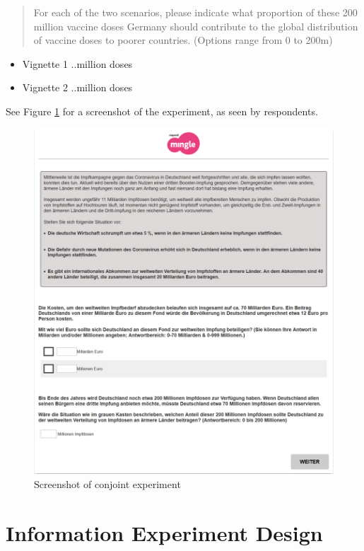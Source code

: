 \documentclass[12pt,oneside]{article}
\begin{document}
\begin{quote}
	For each of the two scenarios, please indicate what proportion of these
	200 million vaccine doses Germany should contribute to the global
	distribution of vaccine doses to poorer countries. (Options range from 0
	to 200m)
\end{quote}

\begin{itemize}
	\item
	Vignette 1 ..million doses
	\item
	Vignette 2 ..million doses
\end{itemize}

See Figure \ref{fig:screen} for a screenshot of the experiment, as seen by respondents.

\begin{figure}[hbt!]
	\includegraphics[width=\linewidth]{../Figures/Experiment_8.png}
	\caption{Screenshot of conjoint experiment}
	\label{fig:screen}
\end{figure}




\clearpage
\section{Information Experiment Design}
\end{document}
